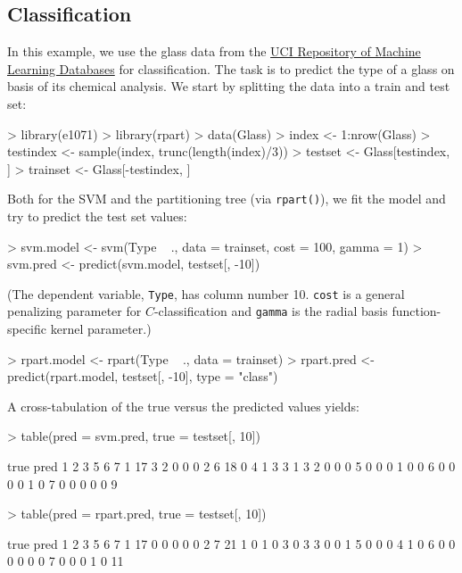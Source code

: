 \documentclass[a4paper]{article}
\begin{document}
\subsection*{Classification}

In this example, we use the glass data from the \href{http://www.ics.uci.edu/mlearn/MLRepository.html}{UCI Repository of
Machine Learning Databases} for
classification. The task is to predict the type of a glass on basis
of its chemical analysis.
We start by splitting the data into a train and test set:
\begin{Schunk}
\begin{Sinput}
> library(e1071)
> library(rpart)
> data(Glass)
> index <- 1:nrow(Glass)
> testindex <- sample(index, trunc(length(index)/3))
> testset <- Glass[testindex, ]
> trainset <- Glass[-testindex, ]
\end{Sinput}
\end{Schunk}
Both for the SVM and the partitioning tree (via
\texttt{rpart()}), we fit the model and try to predict the test set
values:
\begin{Schunk}
\begin{Sinput}
> svm.model <- svm(Type ~ ., data = trainset, cost = 100, gamma = 1)
> svm.pred <- predict(svm.model, testset[, -10])
\end{Sinput}
\end{Schunk}
(The dependent variable, \texttt{Type}, has column number
10. \texttt{cost} is a general penalizing parameter for $C$-classification and
\texttt{gamma} is the radial basis function-specific kernel parameter.)
\begin{Schunk}
\begin{Sinput}
> rpart.model <- rpart(Type ~ ., data = trainset)
> rpart.pred <- predict(rpart.model, testset[, -10], type = "class")
\end{Sinput}
\end{Schunk}
A cross-tabulation of the true versus the predicted values yields:
\begin{Schunk}
\begin{Sinput}
> table(pred = svm.pred, true = testset[, 10])
\end{Sinput}
\begin{Soutput}
    true
pred 1  2  3  5  6  7 
   1 17  3  2  0  0  0
   2  6 18  0  4  1  3
   3  1  3  2  0  0  0
   5  0  0  0  1  0  0
   6  0  0  0  0  1  0
   7  0  0  0  0  0  9
\end{Soutput}
\begin{Sinput}
> table(pred = rpart.pred, true = testset[, 10])
\end{Sinput}
\begin{Soutput}
    true
pred 1  2  3  5  6  7 
   1 17  0  0  0  0  0
   2  7 21  1  0  1  0
   3  0  3  3  0  0  1
   5  0  0  0  4  1  0
   6  0  0  0  0  0  0
   7  0  0  0  1  0 11
\end{Soutput}
\end{Schunk}
\end{document}

